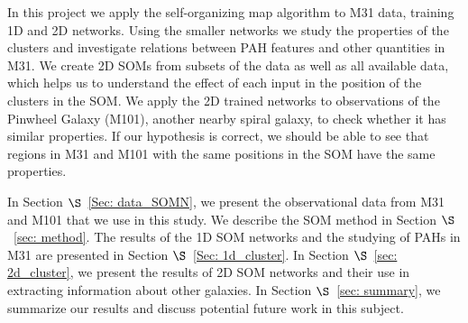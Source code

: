 In this project we apply the self-organizing map algorithm to M31 data, training 1D and 2D networks.
Using the smaller networks we study the properties of the clusters and investigate relations between PAH features and other quantities in M31.
We create 2D SOMs from subsets of the data as well as all available data, which helps us to understand the effect of each input in the position of the clusters in the SOM.%
We apply the 2D trained networks to  observations of the Pinwheel Galaxy (M101), another nearby spiral  galaxy, to check whether it has similar properties.
If our hypothesis is correct, we should be able to see that regions in M31 and M101 with the same positions in the SOM have the same properties.

In Section $\S$~\ref{Sec: data_SOMN}, we present the observational data from M31 and M101 that we use in this study. 
We describe the SOM method in Section $\S$~\ref{sec: method}. 
The results of the 1D SOM networks and the studying of PAHs in M31 are presented in Section $\S$~\ref{Sec: 1d_cluster}.
In Section $\S$~\ref{sec: 2d_cluster}, we present the results of 2D SOM networks and their use in extracting information about other galaxies.
In Section $\S$~\ref{sec: summary}, we summarize our results and discuss potential future work in this subject.

















